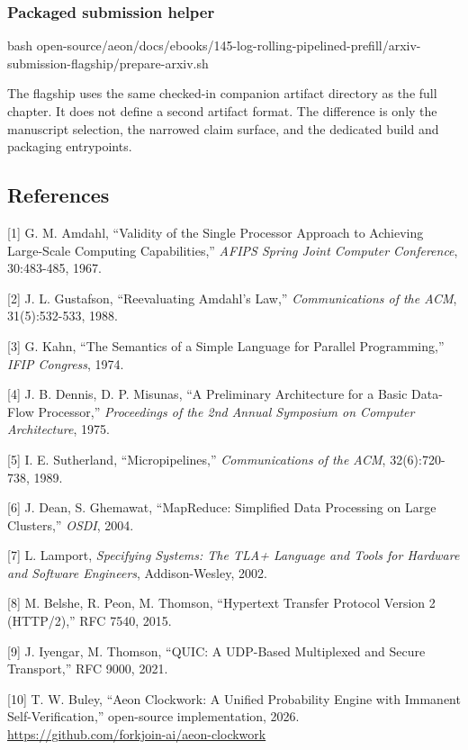 \documentclass[
  11pt,
]{article}
\newenvironment{Shaded}{}{}
\newcommand{\FunctionTok}[1]{\textcolor[rgb]{0.02,0.16,0.49}{#1}}
\newcommand{\NormalTok}[1]{#1}
\begin{document}
\subsubsection{Packaged submission
helper}\label{packaged-submission-helper}

\begin{Shaded}
\begin{Highlighting}[]
\FunctionTok{bash}\NormalTok{ open{-}source/aeon/docs/ebooks/145{-}log{-}rolling{-}pipelined{-}prefill/arxiv{-}submission{-}flagship/prepare{-}arxiv.sh}
\end{Highlighting}
\end{Shaded}

The flagship uses the same checked-in companion artifact directory as
the full chapter. It does not define a second artifact format. The
difference is only the manuscript selection, the narrowed claim surface,
and the dedicated build and packaging entrypoints.

\subsection{References}\label{references}

{[}1{]} G. M. Amdahl, ``Validity of the Single Processor Approach to
Achieving Large-Scale Computing Capabilities,'' \emph{AFIPS Spring Joint
Computer Conference}, 30:483-485, 1967.

{[}2{]} J. L. Gustafson, ``Reevaluating Amdahl's Law,''
\emph{Communications of the ACM}, 31(5):532-533, 1988.

{[}3{]} G. Kahn, ``The Semantics of a Simple Language for Parallel
Programming,'' \emph{IFIP Congress}, 1974.

{[}4{]} J. B. Dennis, D. P. Misunas, ``A Preliminary Architecture for a
Basic Data-Flow Processor,'' \emph{Proceedings of the 2nd Annual
Symposium on Computer Architecture}, 1975.

{[}5{]} I. E. Sutherland, ``Micropipelines,'' \emph{Communications of
the ACM}, 32(6):720-738, 1989.

{[}6{]} J. Dean, S. Ghemawat, ``MapReduce: Simplified Data Processing on
Large Clusters,'' \emph{OSDI}, 2004.

{[}7{]} L. Lamport, \emph{Specifying Systems: The TLA+ Language and
Tools for Hardware and Software Engineers}, Addison-Wesley, 2002.

{[}8{]} M. Belshe, R. Peon, M. Thomson, ``Hypertext Transfer Protocol
Version 2 (HTTP/2),'' RFC 7540, 2015.

{[}9{]} J. Iyengar, M. Thomson, ``QUIC: A UDP-Based Multiplexed and
Secure Transport,'' RFC 9000, 2021.

{[}10{]} T. W. Buley, ``Aeon Clockwork: A Unified Probability Engine
with Immanent Self-Verification,'' open-source implementation, 2026.
\url{https://github.com/forkjoin-ai/aeon-clockwork}
\end{document}
